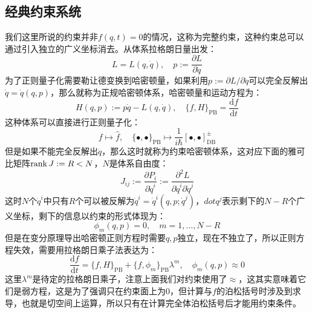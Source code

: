 \subsection{经典约束系统}
我们这里所说的约束并非$f(q,t)=0$的情况，这称为完整约束，这种约束总可以通过引入独立的广义坐标消去。从体系拉格朗日量出发：
\begin{equation}
	L=L(q,\dot q),\quad p:=\frac{\partial L}{\partial \dot q}
\end{equation}
为了正则量子化需要勒让德变换到哈密顿量，如果利用$p:={\partial L}/{\partial \dot q}$可以完全反解出$\dot q = \dot q(q,p)$，那么就称为正规哈密顿体系，哈密顿量和运动方程为：
\begin{equation}
	H(q,p) := p\dot{q}-L(q,\dot{q}),\quad \{f,H\}_{\text{PB}} = \frac{\mathrm{d} f}{\mathrm{d} t}
\end{equation}
这种体系可以直接进行正则量子化：
\begin{equation}
	\label{canonical}
	f\mapsto \hat f,\quad \{\bullet,\bullet\}_{\text{PB}}\mapsto \frac{1}{i\hbar} [\bullet,\bullet]^{\pm}_{\text{DB}}
\end{equation}
但是如果不能完全反解出$\dot q$，那么这时就称为约束哈密顿体系，这对应下面的雅可比矩阵$\rank J := R<N$，$N$是体系自由度：
\begin{equation}
	J_{ij}:=\frac{\partial P_i}{\partial \dot{q}^i}:=\frac{\partial^2 L}{\partial \dot{q}^i\partial \dot{q}^j}
\end{equation}
这时$N$个$\dot{q}^i$中只有$R$个可以被反解为$\dot{q}^i=\dot{q}^i(q,p;\dot{q}^j)$，$dot{q}^j$表示剩下的$N-R$个广义坐标，剩下的信息以约束的形式体现为：
\begin{equation}
	\phi_m(q,p)=0,\quad m = 1,\ldots,N-R 
\end{equation}
但是在变分原理导出哈密顿正则方程时需要$q,p$独立，现在不独立了，所以正则方程失效，需要用拉格朗日乘子法表达为：
\begin{equation}
	\frac{\mathrm{d}f}{\mathrm{d}t} = \{f,H\}_{\text{PB}}+\{f,\phi_m\}_{\text{PB}}\lambda^m,\quad 	\phi_m(q,p)\approx0
\end{equation}
这里$\lambda^m$是待定的拉格朗日乘子，注意上面我们对约束使用了$\approx$，这其实意味着它们是弱方程，这是为了强调只在约束面上为$0$，但计算与$f$的泊松括号时涉及到求导，也就是切空间上运算，所以只有在计算完全体泊松括号后才能用约束条件。

